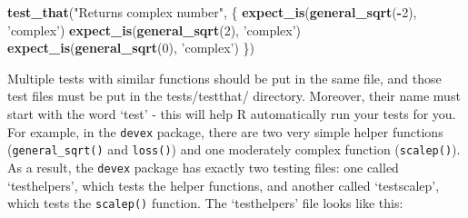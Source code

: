 \documentclass[]{book}
\newenvironment{Shaded}{\begin{snugshade}}{\end{snugshade}}
\newcommand{\KeywordTok}[1]{\textcolor[rgb]{0.13,0.29,0.53}{\textbf{#1}}}
\newcommand{\DecValTok}[1]{\textcolor[rgb]{0.00,0.00,0.81}{#1}}
\newcommand{\StringTok}[1]{\textcolor[rgb]{0.31,0.60,0.02}{#1}}
\newcommand{\OperatorTok}[1]{\textcolor[rgb]{0.81,0.36,0.00}{\textbf{#1}}}
\newcommand{\NormalTok}[1]{#1}
\begin{document}
\begin{Shaded}
\begin{Highlighting}[]
\KeywordTok{test_that}\NormalTok{(}\StringTok{"Returns complex number"}\NormalTok{, \{}
  \KeywordTok{expect_is}\NormalTok{(}\KeywordTok{general_sqrt}\NormalTok{(}\OperatorTok{-}\DecValTok{2}\NormalTok{), }\StringTok{'complex'}\NormalTok{)}
  \KeywordTok{expect_is}\NormalTok{(}\KeywordTok{general_sqrt}\NormalTok{(}\DecValTok{2}\NormalTok{), }\StringTok{'complex'}\NormalTok{)}
  \KeywordTok{expect_is}\NormalTok{(}\KeywordTok{general_sqrt}\NormalTok{(}\DecValTok{0}\NormalTok{), }\StringTok{'complex'}\NormalTok{)}
\NormalTok{\})}
\end{Highlighting}
\end{Shaded}

Multiple tests with similar functions should be put in the same file,
and those test files must be put in the tests/testthat/ directory.
Moreover, their name must start with the word `test' - this will help R
automatically run your tests for you. For example, in the \texttt{devex}
package, there are two very simple helper functions
(\texttt{general\_sqrt()} and \texttt{loss()}) and one moderately
complex function (\texttt{scalep()}). As a result, the \texttt{devex}
package has exactly two testing files: one called `testhelpers', which
tests the helper functions, and another called `testscalep', which tests
the \texttt{scalep()} function. The `testhelpers' file looks like this:
\end{document}
